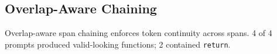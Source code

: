\subsection{Overlap-Aware Chaining}
Overlap-aware span chaining enforces token continuity across spans.
4 of 4 prompts produced valid-looking functions; 2 contained \texttt{return}.
